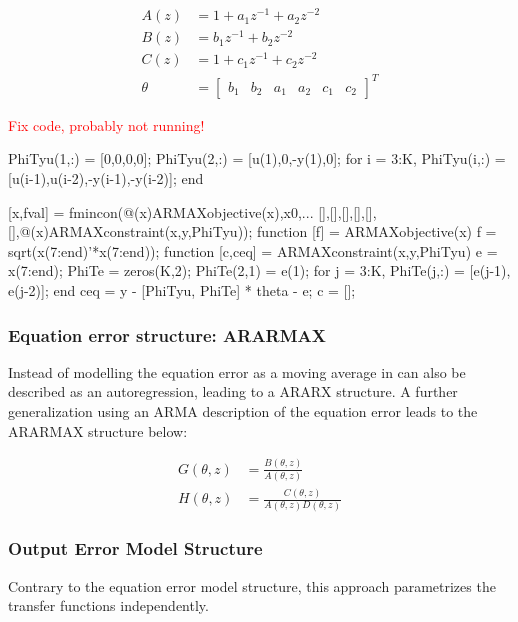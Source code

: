 \documentclass[10pt,a4paper]{scrartcl}
\begin{document}
\begin{multicols*}{2}
\begin{align*}
A(z) &= 1+a_1z^{-1}+a_2z^{-2}\\
B(z)&= b_1z^{-1}+b_2z^{-2}\\
C(z)&=1+c_1z^{-1}+c_2z^{-2}\\
\theta&=\begin{bmatrix}
b_1&b_2&a_1&a_2&c_1&c_2
\end{bmatrix}^T
\end{align*}

\textcolor{red}{Fix code, probably not running!}

\begin{TPMatlab}
PhiTyu(1,:) = [0,0,0,0];
PhiTyu(2,:) = [u(1),0,-y(1),0];
for i = 3:K,
	PhiTyu(i,:) = [u(i-1),u(i-2),-y(i-1),-y(i-2)];
end

[x,fval] = fmincon(@(x)ARMAXobjective(x),x0,...
[],[],[],[],[],[],@(x)ARMAXconstraint(x,y,PhiTyu));
function [f] = ARMAXobjective(x) %
f = sqrt(x(7:end)'*x(7:end));
function [c,ceq] = ARMAXconstraint(x,y,PhiTyu)
e = x(7:end);
PhiTe = zeros(K,2);
PhiTe(2,1) = e(1);
for j = 3:K,
PhiTe(j,:) = [e(j-1), e(j-2)];
end
ceq = y - [PhiTyu, PhiTe] * theta - e; c = [];
\end{TPMatlab}

\subsubsection{Equation error structure: ARARMAX}

Instead of modelling the equation error as a moving average in can also be described as an autoregression, leading to a ARARX structure. A further generalization using an ARMA description of the equation error leads to the ARARMAX structure below:


\begin{align*}
G(\theta,z)&=\frac{B(\theta,z)}{A(\theta,z)}\\
H(\theta,z)&=\frac{C(\theta,z)}{A(\theta,z)D(\theta,z)}
\end{align*}

\subsubsection{Output Error Model Structure}

Contrary to the equation error model structure, this approach parametrizes the transfer functions independently.


\end{multicols*}
\end{document}
